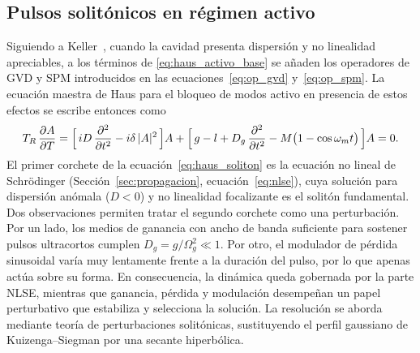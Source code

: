 \subsection{Pulsos solitónicos en régimen activo}
\label{sec:ml_activo_soliton}

Siguiendo a Keller~\cite[sec.~6.6]{Keller2022}, cuando la cavidad presenta dispersión
y no linealidad apreciables, a los términos
de \eqref{eq:haus_activo_base} se añaden los operadores de GVD y SPM introducidos
en las ecuaciones~\eqref{eq:op_gvd} y~\eqref{eq:op_spm}. La ecuación maestra de
Haus para el bloqueo de modos activo en presencia de estos efectos se escribe
entonces como
%
\begin{equation}
    T_R\,\frac{\partial A}{\partial T}
    = \Bigl[\,iD\,\frac{\partial^2}{\partial t^2} - i\delta\,|A|^2 \,\Bigr] A
    + \Bigl[\,g - l + D_g\,\frac{\partial^2}{\partial t^2}
      - M\bigl(1-\cos\omega_m t\bigr) \,\Bigr] A = 0.
    \label{eq:haus_soliton}
\end{equation}
%
El primer corchete de la ecuación~\eqref{eq:haus_soliton} es la ecuación no lineal
de Schrödinger (Sección~\ref{sec:propagacion}, ecuación~\eqref{eq:nlse}), cuya
solución para dispersión anómala ($D<0$) y no linealidad focalizante es el solitón
fundamental. Dos observaciones permiten tratar el segundo corchete como una
perturbación. Por un lado, los medios de ganancia con ancho de banda suficiente
para sostener pulsos ultracortos cumplen $D_g=g/\Omega_g^2\ll 1$. Por otro, el
modulador de pérdida sinusoidal varía muy lentamente frente a la duración del
pulso, por lo que apenas actúa sobre su forma. En consecuencia, la dinámica queda
gobernada por la parte NLSE, mientras que ganancia, pérdida y modulación
desempeñan un papel perturbativo que estabiliza y selecciona la solución. La
resolución se aborda mediante teoría de perturbaciones solitónicas, sustituyendo
el perfil gaussiano de Kuizenga--Siegman por una secante hiperbólica.


